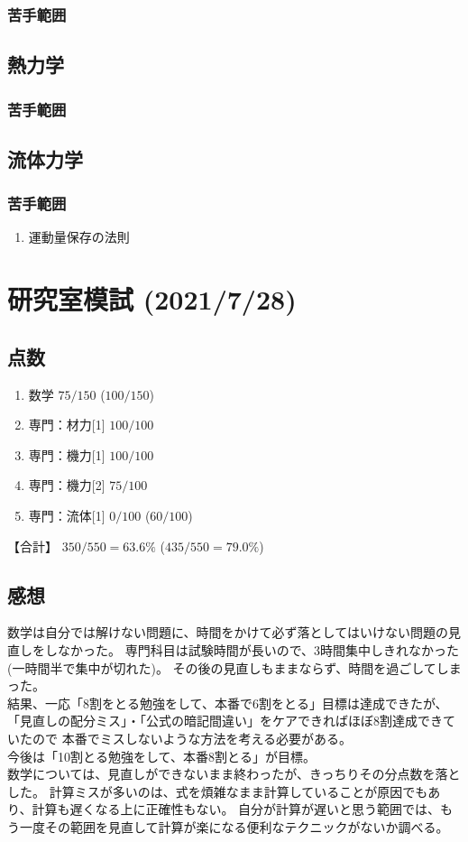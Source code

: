 \documentclass[a4paper]{jsarticle}
\begin{document}
\subsubsection{苦手範囲}
\subsection{熱力学}
\subsubsection{苦手範囲}
\subsection{流体力学}
\subsubsection{苦手範囲}
\begin{enumerate}[(1)]
    \item 運動量保存の法則
\end{enumerate}
\newpage
\section{研究室模試 (2021/7/28)}
\subsection{点数}
\begin{enumerate}[(1)]
    \item 数学 \qquad \qquad $75/150$ ($100/150$)
    \item 専門：材力[1] $100/100$
    \item 専門：機力[1] $100/100$
    \item 専門：機力[2] $75/100$
    \item 専門：流体[1] $0/100$ ($60/100$)
\end{enumerate}
【合計】 $350/550 = 63.6 \%$ \quad ($435/550 = 79.0\%$)
\subsection{感想}
数学は自分では解けない問題に、時間をかけて必ず落としてはいけない問題の見直しをしなかった。
専門科目は試験時間が長いので、3時間集中しきれなかった(一時間半で集中が切れた)。
その後の見直しもままならず、時間を過ごしてしまった。\\
結果、一応「8割をとる勉強をして、本番で6割をとる」目標は達成できたが、
「見直しの配分ミス」・「公式の暗記間違い」をケアできればほぼ8割達成できていたので
本番でミスしないような方法を考える必要がある。\\
今後は「10割とる勉強をして、本番8割とる」が目標。\\
数学については、見直しができないまま終わったが、きっちりその分点数を落とした。
計算ミスが多いのは、式を煩雑なまま計算していることが原因でもあり、計算も遅くなる上に正確性もない。
自分が計算が遅いと思う範囲では、もう一度その範囲を見直して計算が楽になる便利なテクニックがないか調べる。
\end{document}
